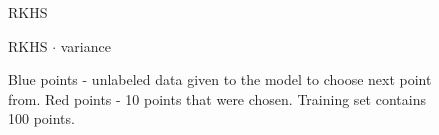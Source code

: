 \documentclass[a4paper]{article}
\begin{document}
\begin{figure}[h]
\begin{minipage}[h]{0.49\linewidth}
\end{minipage}
\hfill
\begin{minipage}[h]{0.49\linewidth}
 RKHS
\end{minipage}
\vfill
\begin{minipage}[h]{0.49\linewidth}
 RKHS $\cdot$ variance
\end{minipage}
\caption{Blue points - unlabeled data given to the model to choose next point from. Red points - 10 points that were chosen. Training set contains 100 points.}
\label{recent2}
\end{figure}
\end{document}
